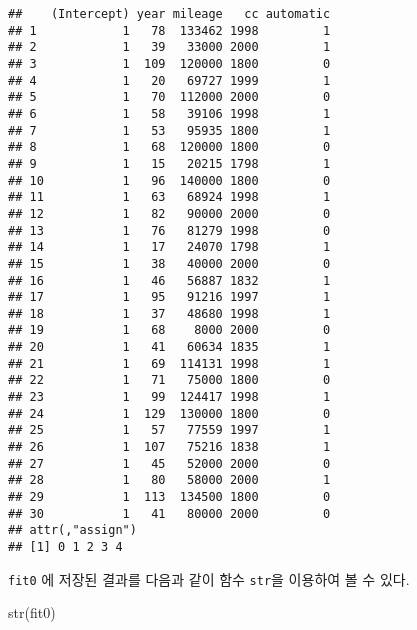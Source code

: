 \documentclass[
]{book}
\newenvironment{Shaded}{\begin{snugshade}}{\end{snugshade}}
\newcommand{\FunctionTok}[1]{\textcolor[rgb]{0.00,0.00,0.00}{#1}}
\newcommand{\NormalTok}[1]{#1}
\begin{document}
\begin{verbatim}
##    (Intercept) year mileage   cc automatic
## 1            1   78  133462 1998         1
## 2            1   39   33000 2000         1
## 3            1  109  120000 1800         0
## 4            1   20   69727 1999         1
## 5            1   70  112000 2000         0
## 6            1   58   39106 1998         1
## 7            1   53   95935 1800         1
## 8            1   68  120000 1800         0
## 9            1   15   20215 1798         1
## 10           1   96  140000 1800         0
## 11           1   63   68924 1998         1
## 12           1   82   90000 2000         0
## 13           1   76   81279 1998         0
## 14           1   17   24070 1798         1
## 15           1   38   40000 2000         0
## 16           1   46   56887 1832         1
## 17           1   95   91216 1997         1
## 18           1   37   48680 1998         1
## 19           1   68    8000 2000         0
## 20           1   41   60634 1835         1
## 21           1   69  114131 1998         1
## 22           1   71   75000 1800         0
## 23           1   99  124417 1998         1
## 24           1  129  130000 1800         0
## 25           1   57   77559 1997         1
## 26           1  107   75216 1838         1
## 27           1   45   52000 2000         0
## 28           1   80   58000 2000         1
## 29           1  113  134500 1800         0
## 30           1   41   80000 2000         0
## attr(,"assign")
## [1] 0 1 2 3 4
\end{verbatim}

\texttt{fit0} 에 저장된 결과를 다음과 같이 함수 \texttt{str}을 이용하여 볼 수 있다.

\begin{Shaded}
\begin{Highlighting}[]
\FunctionTok{str}\NormalTok{(fit0)}
\end{Highlighting}
\end{Shaded}
\end{document}
